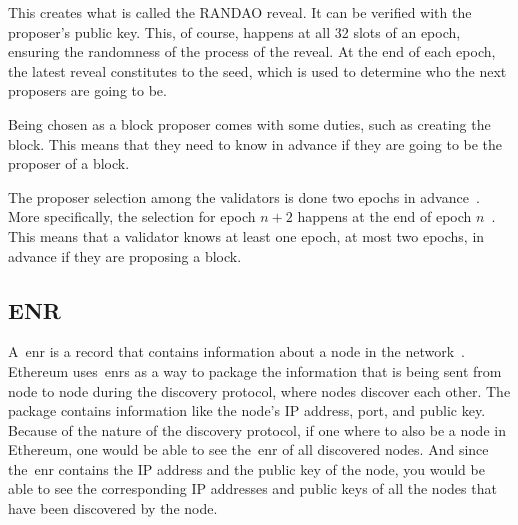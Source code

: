 This creates what is called the RANDAO reveal.
It can be verified with the proposer's public key.
This, of course, happens at all 32 slots of an epoch, ensuring the randomness of the process of the reveal.
At the end of each epoch, the latest reveal constitutes to the seed, which is used to determine who the next proposers are going to be.


Being chosen as a block proposer comes with some duties, such as creating the block.
This means that they need to know in advance if they are going to be the proposer of a block.

The proposer selection among the validators is done two epochs in advance~\cite{random-selection}.
More specifically, the selection for epoch $n+2$ happens at the end of epoch $n$~\cite{upgrading-ethereum-randomness}.
This means that a validator knows at least one epoch, at most two epochs, in advance if they are proposing a block.


\subsection{ENR}\label{subsec:enr}
A~\gls{enr} is a record that contains information about a node in the network~\cite{EIP-778:Ethereum-Node-Records}.
Ethereum uses~\glspl{enr} as a way
to package the information that is being sent from node to node during the discovery protocol,
where nodes discover each other.
The package contains information like the node's IP address, port, and public key.
Because of the nature of the discovery protocol, if one where to also be a node in Ethereum,
one would be able to see the~\gls{enr} of all discovered nodes.
And since the~\gls{enr} contains the IP address and the public key of the node,
you would be able
to see the corresponding IP addresses and public keys of all the nodes that have been discovered by the node.


